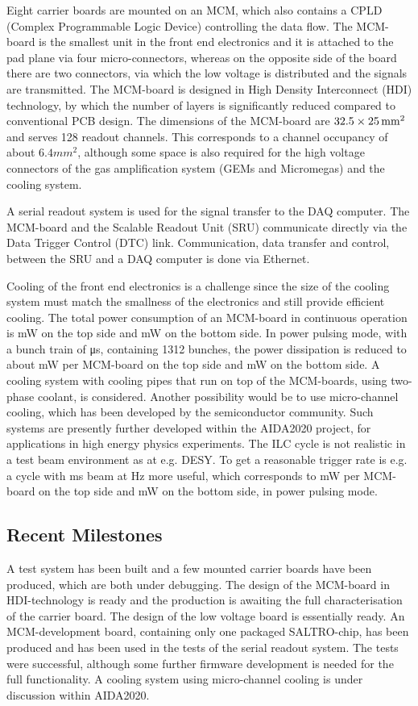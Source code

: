 \noindent Eight carrier boards are mounted on an MCM, which also contains a CPLD (Complex Programmable Logic Device) controlling the data flow. The MCM-board is the smallest unit in the front end electronics and it is attached to the pad plane via four micro-connectors, whereas on the opposite side of the board there are two connectors, via which the low voltage is distributed and the signals are transmitted. The MCM-board is designed in High Density Interconnect (HDI) technology, by which the number of layers is significantly reduced compared to conventional PCB design. The dimensions of the MCM-board are $32.5 \times \unit[25]{mm^2}$ and serves 128 readout channels. This corresponds to a channel occupancy of about $\unit{6.4}{mm^{2}}$, although some space is also required for the high voltage connectors of the gas amplification system (GEMs and Micromegas) and the cooling system.

\noindent A serial readout system is used for the signal transfer to the DAQ computer. The MCM-board and the Scalable Readout Unit (SRU) communicate directly via the Data Trigger Control (DTC) link. Communication, data transfer and control, between the SRU and a DAQ computer is done via Ethernet.

\noindent Cooling of the front end electronics is a challenge since the size of the cooling system must match the smallness of the electronics and still provide efficient cooling. The total power consumption of an MCM-board in continuous operation
is \unit[3203]{mW} on the top side and \unit[3028]{mW} on the bottom side. In power pulsing mode, with a bunch train of \unit[725]{\micro s}, containing 1312 bunches, the power dissipation is reduced to about \unit[223]{mW} per MCM-board on the top side and \unit[48]{mW} on the bottom side. A cooling system with cooling pipes that run on top of the MCM-boards, using two-phase  coolant, is considered. Another possibility would be to use micro-channel cooling, which has been developed by the semiconductor community. Such systems are presently further developed within the AIDA2020 project, for applications in high energy physics experiments. The ILC cycle is not realistic in a test beam environment as at e.g. DESY. To get a reasonable trigger rate is e.g. a cycle with \unit[5]{ms} beam at \unit[10]{Hz} more useful, which corresponds to \unit[343]{mW} per MCM-board on the top side and \unit[168]{mW} on the bottom side, in power pulsing mode.

\subsection{Recent Milestones}
A test system has been built and a few mounted carrier boards have been produced, which are both under debugging. The design of the MCM-board in HDI-technology is ready and the production is awaiting the full characterisation of the carrier board. The design of the low voltage board is essentially ready. An MCM-development board, containing only one packaged SALTRO-chip, has been produced and has been used in the tests of the serial readout system. The tests were successful, although some further firmware development is needed for the full functionality. A cooling system using micro-channel cooling is under discussion within AIDA2020.

